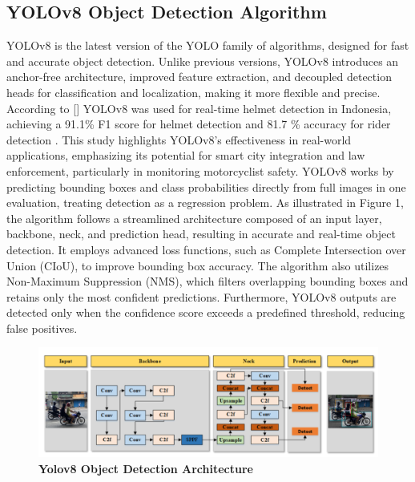 \begin{refsection}
\section*{ YOLOv8 Object Detection Algorithm}


YOLOv8 is the latest version of the YOLO family of algorithms, designed for fast and accurate object detection. Unlike previous versions, YOLOv8 introduces an anchor-free architecture, improved feature extraction, and decoupled detection heads for classification and localization, making it more flexible and precise. According to \citeauthor{Muhammad2024} [\citeyear{Muhammad2024}] YOLOv8 was used for real-time helmet detection in Indonesia, achieving a 91.1\% F1 score for helmet detection and 81.7 \% accuracy for rider detection \cite{Muhammad2024}. This study highlights YOLOv8's effectiveness in real-world applications, emphasizing its potential for smart city integration and law enforcement, particularly in monitoring motorcyclist safety.
YOLOv8 works by predicting bounding boxes and class probabilities directly from full images in one evaluation, treating detection as a regression problem. As illustrated in Figure 1, the algorithm follows a streamlined architecture composed of an input layer, backbone, neck, and prediction head, resulting in accurate and real-time object detection. It employs advanced loss functions, such as Complete Intersection over Union (CIoU), to improve bounding box accuracy. The algorithm also utilizes Non-Maximum Suppression (NMS), which filters overlapping bounding boxes and retains only the most confident predictions. Furthermore, YOLOv8 outputs are detected only when the confidence score exceeds a predefined threshold, reducing false positives.


\begin{figure}[H]
    \centering
    \includegraphics[width=1\textwidth]{figures/Fig 1.png} %
    \caption{\textbf{Yolov8 Object Detection Architecture}}
    \label{fig:yolov8_architecture}
\end{figure}





\end{refsection}
